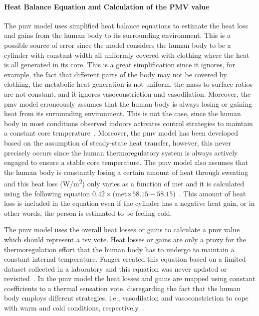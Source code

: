 \paragraph{Heat Balance Equation and Calculation of the PMV value}
The \ac{pmv} model uses simplified heat balance equations to estimate the heat loss and gains from the human body to its surrounding environment.
This is a possible source of error since the model considers the human body to be a cylinder with constant width all uniformly covered with clothing where the heat is all generated in its core.
This is a great simplification since it ignores, for example, the fact that different parts of the body may not be covered by clothing, the metabolic heat generation is not uniform, the mass-to-surface ratios are not constant, and it ignores vasoconstriction and vasodilation.
Moreover, the \ac{pmv} model erroneously assumes that the human body is always losing or gaining heat from its surrounding environment.
This is not the case, since the human body in most conditions observed indoors activates control strategies to maintain a constant core temperature~\cite{romanovsky_thermoregulation_2018}.
Moreover, the \ac{pmv} model has been developed based on the assumption of steady-state heat transfer, however, this never precisely occurs since the human thermoregulatory system is always actively engaged to ensure a stable core temperature.
The \ac{pmv} model also assumes that the human body is constantly losing a certain amount of heat through sweating and this heat loss (W/m\textsuperscript{2}) only varies as a function of \ac{met} and it is calculated using the following equation $0.42\times($\ac{met}$\times58.15 - 58.15)$~\cite{Fanger1970}.
This amount of heat loss is included in the equation even if the cylinder has a negative heat gain, or in other words, the person is estimated to be feeling cold.

The \ac{pmv} model uses the overall heat losses or gains to calculate a \ac{pmv} value which should represent a \ac{tsv} vote.
Heat losses or gains are only a proxy for the thermoregulation effort that the human body has to undergo to maintain a constant internal temperature.
Fanger created this equation based on a limited dataset collected in a laboratory and this equation was never updated or revisited~\cite{Fanger1970}.
In the \ac{pmv} model the heat losses and gains are mapped using constant coefficients to a thermal sensation vote, disregarding the fact that the human body employs different strategies, i.e., vasodilation and vasoconstriction to cope with warm and cold conditions, respectively~\cite{romanovsky_thermoregulation_2018}.


